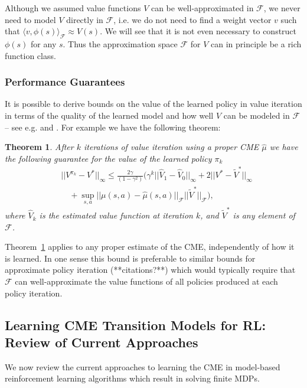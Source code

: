 \documentclass[letterpaper]{article}
\newtheorem{theorem}{Theorem}[section]
\newcommand{\CsabaFLAM}{DBLP:conf/adprl/YaoSPZ14}
\newcommand{\GrunewalderEmbeddingsRL}{GrunewalderEmbeddingsMDP}
\newcommand{\cF}{{\mathcal F}}
\newcommand{\lang}{\langle}
\newcommand{\rang}{\rangle}
\newcommand{\nn}{\nonumber}
\begin{document}
Although we assumed value functions $V$ can be well-approximated in $\cF$, we never need to model $V$ directly in $\cF$, i.e. we do not need to find a weight vector $v$ such that $\lang v,\phi(s)\rang_{\cF} \approx V(s)$. We will see that it is not even necessary to construct $\phi(s)$ for any $s$. Thus the approximation space $\cF$ for $V$ can in principle be a rich function class.

\subsubsection{Performance Guarantees}\label{PerformanceGuarantees}

It is possible to derive bounds on the value of the learned policy in value iteration in terms of the quality of the learned model and how well $V$ can be modeled in $\cF$ -- see e.g. \cite{\GrunewalderEmbeddingsRL} and \cite{\CsabaFLAM}. For example we have the following theorem:
\begin{theorem}{\citep[][Theorem 3.2]{\GrunewalderEmbeddingsRL}} \label{ICMLtheorem}
After $k$ iterations of value iteration using a proper CME $\hat\mu$ we have the following guarantee for the value of the learned policy $\pi_k$
\begin{align}
&||V^{\pi_k} - V^*||_{\infty}\le \frac{2\gamma}{(1-\gamma^2)}\Big( \gamma^k ||\hat V_1 - \hat V_0||_{\infty} + 2|| V^* - \tilde V^* ||_{\infty}  \nn\\
&\quad+\sup_{s,a} ||\mu(s,a) - \hat\mu(s,a)||_{\cF}||\tilde V^*||_{\cF} \Big), \label{ICMLbound}
\end{align}
where $\hat V_k$ is the estimated value function at iteration $k$, and $\tilde V^*$ is any element of $\cF$.
\end{theorem}
Theorem~\ref{ICMLtheorem} applies to any proper estimate of the CME, independently of how it is learned. In one sense this bound is preferable to similar bounds for approximate policy iteration (**citations?**) which would typically require that $\cF$ can well-approximate the value functions of all policies produced at each policy iteration.

\subsection{Learning CME Transition Models for RL: Review of Current Approaches} \label{learningCMEs}

We now review the current approaches to learning the CME in model-based reinforcement learning algorithms which result in solving finite MDPs.
\end{document}
